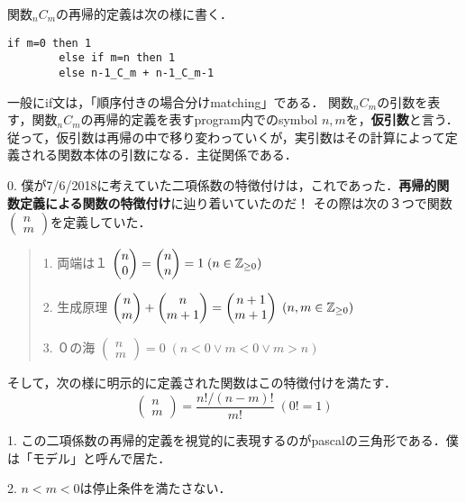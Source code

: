 \documentclass[uplatex, 12pt, dvipdfmx]{jsreport}
\begin{document}
\begin{definition}[再帰的関数定義]
    関数${}_nC_m$の再帰的定義は次の様に書く．
    \begin{lstlisting}[caption=recursive definition]
        if m=0 then 1
        else if m=n then 1
        else n-1_C_m + n-1_C_m-1
    \end{lstlisting}
    一般にif文は，「順序付きの場合分けmatching」である．
    関数${}_nC_m$の引数を表す，関数${}_nC_m$の再帰的定義を表すprogram内でのsymbol $n,m$を，\textbf{仮引数}と言う．
    従って，仮引数は再帰の中で移り変わっていくが，実引数はその計算によって定義される関数本体の引数になる．主従関係である．
\end{definition}
\begin{remark}
    0. 僕が7/6/2018に考えていた二項係数の特徴付けは，これであった．\textbf{再帰的関数定義による関数の特徴付け}に辿り着いていたのだ！
    その際は次の３つで関数$\begin{pmatrix}n\\m\end{pmatrix}$を定義していた．
    \begin{quotation}
        1. 両端は１ $\begin{pmatrix}n\\0\end{pmatrix}=\begin{pmatrix}n\\n\end{pmatrix}=1\;(n\in\mathbb{Z}_{\ge 0})$

        2. 生成原理 $\begin{pmatrix}n\\m\end{pmatrix} + \begin{pmatrix}n\\m+1\end{pmatrix} = \begin{pmatrix}n+1\\m+1\end{pmatrix}\;(n,m\in\mathbb{Z}_{\ge 0})$

        3. ０の海 $\begin{pmatrix}n\\m\end{pmatrix}=0\;(n<0\lor m<0\lor m>n)$
    \end{quotation}
    そして，次の様に明示的に定義された関数はこの特徴付けを満たす．
    \[ \begin{pmatrix}n\\m\end{pmatrix} = \frac{n!/(n-m)!}{m!}\;(0!=1) \]

    1. この二項係数の再帰的定義を視覚的に表現するのがpascalの三角形である．僕は「モデル」と呼んで居た．

    2. $n<m<0$は停止条件を満たさない．
\end{remark}
\end{document}
